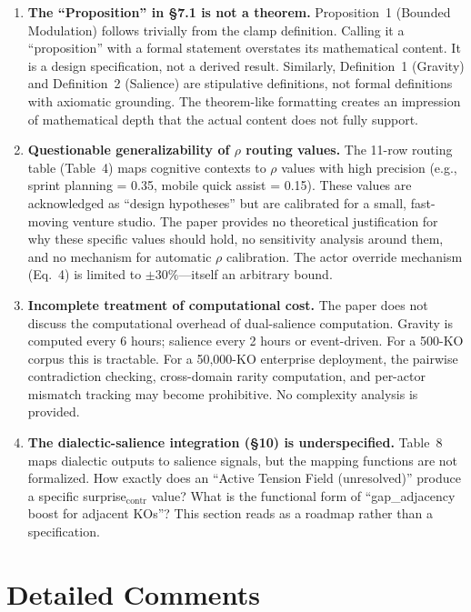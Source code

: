\documentclass[11pt,a4paper]{article}
\begin{document}
\begin{enumerate}[label=\textbf{W\arabic*.}, leftmargin=2em]
\item \textbf{The ``Proposition'' in \S7.1 is not a theorem.} Proposition~1 (Bounded Modulation) follows trivially from the clamp definition. Calling it a ``proposition'' with a formal statement overstates its mathematical content. It is a design specification, not a derived result. Similarly, Definition~1 (Gravity) and Definition~2 (Salience) are stipulative definitions, not formal definitions with axiomatic grounding. The theorem-like formatting creates an impression of mathematical depth that the actual content does not fully support.

\item \textbf{Questionable generalizability of $\rho$ routing values.} The 11-row routing table (Table~4) maps cognitive contexts to $\rho$ values with high precision (e.g., sprint planning = 0.35, mobile quick assist = 0.15). These values are acknowledged as ``design hypotheses'' but are calibrated for a small, fast-moving venture studio. The paper provides no theoretical justification for why these specific values should hold, no sensitivity analysis around them, and no mechanism for automatic $\rho$ calibration. The actor override mechanism (Eq.~4) is limited to $\pm 30\%$---itself an arbitrary bound.

\item \textbf{Incomplete treatment of computational cost.} The paper does not discuss the computational overhead of dual-salience computation. Gravity is computed every 6 hours; salience every 2 hours or event-driven. For a 500-KO corpus this is tractable. For a 50,000-KO enterprise deployment, the pairwise contradiction checking, cross-domain rarity computation, and per-actor mismatch tracking may become prohibitive. No complexity analysis is provided.

\item \textbf{The dialectic-salience integration (\S10) is underspecified.} Table~8 maps dialectic outputs to salience signals, but the mapping functions are not formalized. How exactly does an ``Active Tension Field (unresolved)'' produce a specific surprise$_{\text{contr}}$ value? What is the functional form of ``gap\_adjacency boost for adjacent KOs''? This section reads as a roadmap rather than a specification.

\end{enumerate}

\section{Detailed Comments}
\end{document}
